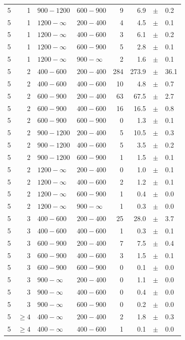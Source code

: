 \begin{table}[!h]
\begin{tabular}{rrllrrcl}
5 & 1 & $ 900-1200$ & $600-900$ &      9 &      6.9 &$\pm$&    0.2 \\
5 & 1 & $1200- \infty$ & $200-400$ &      4 &      4.5 &$\pm$&    0.1 \\
5 & 1 & $1200- \infty$ & $400-600$ &      3 &      6.1 &$\pm$&    0.2 \\
5 & 1 & $1200- \infty$ & $600-900$ &      5 &      2.8 &$\pm$&    0.1 \\
5 & 1 & $1200- \infty$ & $900-\infty$ &      2 &      1.6 &$\pm$&    0.1 \\
5 & 2 & $ 400- 600$ & $200-400$ &    284 &    273.9 &$\pm$&   36.1 \\
5 & 2 & $ 400- 600$ & $400-600$ &     10 &      4.8 &$\pm$&    0.7 \\
5 & 2 & $ 600- 900$ & $200-400$ &     63 &     67.5 &$\pm$&    2.7 \\
5 & 2 & $ 600- 900$ & $400-600$ &     16 &     16.5 &$\pm$&    0.8 \\
5 & 2 & $ 600- 900$ & $600-900$ &      0 &      1.3 &$\pm$&    0.1 \\
5 & 2 & $ 900-1200$ & $200-400$ &      5 &     10.5 &$\pm$&    0.3 \\
5 & 2 & $ 900-1200$ & $400-600$ &      5 &      3.5 &$\pm$&    0.2 \\
5 & 2 & $ 900-1200$ & $600-900$ &      1 &      1.5 &$\pm$&    0.1 \\
5 & 2 & $1200- \infty$ & $200-400$ &      0 &      1.0 &$\pm$&    0.1 \\
5 & 2 & $1200- \infty$ & $400-600$ &      2 &      1.2 &$\pm$&    0.1 \\
5 & 2 & $1200- \infty$ & $600-900$ &      1 &      0.4 &$\pm$&    0.0 \\
5 & 2 & $1200- \infty$ & $900-\infty$ &      1 &      0.3 &$\pm$&    0.0 \\
5 & 3 & $ 400- 600$ & $200-400$ &     25 &     28.0 &$\pm$&    3.7 \\
5 & 3 & $ 400- 600$ & $400-600$ &      1 &      0.3 &$\pm$&    0.1 \\
5 & 3 & $ 600- 900$ & $200-400$ &      7 &      7.5 &$\pm$&    0.4 \\
5 & 3 & $ 600- 900$ & $400-600$ &      3 &      1.5 &$\pm$&    0.1 \\
5 & 3 & $ 600- 900$ & $600-900$ &      0 &      0.1 &$\pm$&    0.0 \\
5 & 3 & $ 900- \infty$ & $200-400$ &      0 &      1.1 &$\pm$&    0.0 \\
5 & 3 & $ 900- \infty$ & $400-600$ &      0 &      0.4 &$\pm$&    0.0 \\
5 & 3 & $ 900- \infty$ & $600-900$ &      0 &      0.2 &$\pm$&    0.0 \\
5 & $\geq 4$ & $ 400- \infty$ & $200-400$ &      2 &      1.8 &$\pm$&    0.3 \\
5 & $\geq 4$ & $ 400- \infty$ & $400-600$ &      1 &      0.1 &$\pm$&    0.0 \\
    \hline
  \end{tabular}
\end{table}

